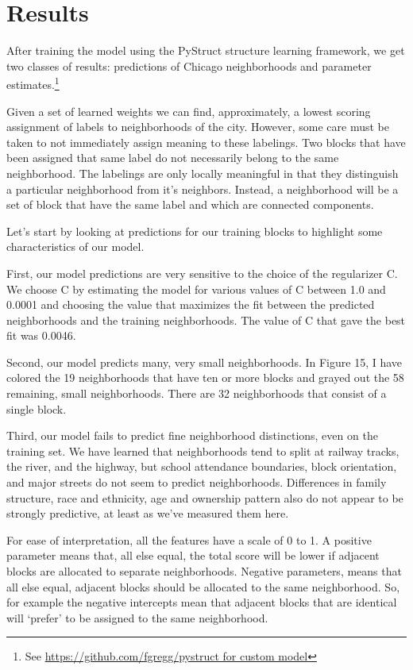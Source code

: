 \documentclass[12pt,letter]{article}\usepackage[]{graphicx}\usepackage[]{color}
\begin{document}
\section*{Results}
After training the model using the PyStruct structure learning
framework,\cite{mueller_pystruct:_????} we get two classes of results:
predictions of Chicago neighborhoods and parameter estimates.\footnote{See \url{https://github.com/fgregg/pystruct for custom model}}

Given a set of learned weights we can find, approximately, a lowest
scoring assignment of labels to neighborhoods of the city. However,
some care must be taken to not immediately assign meaning to these
labelings. Two blocks that have been assigned that same label do not
necessarily belong to the same neighborhood. The labelings are only
locally meaningful in that they distinguish a particular neighborhood
from it’s neighbors. Instead, a neighborhood will be a set of block
that have the same label and which are connected components.  

Let’s start by looking at predictions for our training blocks to
highlight some characteristics of our model.


First, our model predictions are very sensitive to the choice of the regularizer
C. We choose C by estimating the model for various values of C between
1.0 and 0.0001 and choosing the value that maximizes the fit between the
predicted neighborhoods and the training neighborhoods. The value of C
that gave the best fit was 0.0046.

Second, our model predicts many, very small neighborhoods. In Figure 15,
I have colored the 19 neighborhoods that have ten or more blocks and grayed
out the 58 remaining, small neighborhoods. There are 32 neighborhoods that
consist of a single block.

Third, our model fails to predict fine neighborhood distinctions, even
on the training set. We have learned that neighborhoods tend to split at
railway tracks, the river, and the highway, but school attendance boundaries,
block orientation, and major streets do not seem to predict neighborhoods.
Differences in family structure, race and ethnicity, age and ownership pattern
also do not appear to be strongly predictive, at least as we’ve measured them
here.

For ease of interpretation, all the features have a scale of 0 to 1. A
positive parameter means that, all else equal, the total score will be
lower if adjacent blocks are allocated to separate
neighborhoods. Negative parameters, means that all else equal,
adjacent blocks should be allocated to the same neighborhood. So, for
example the negative intercepts mean that adjacent blocks that are
identical will ‘prefer’ to be assigned to the same neighborhood.
\end{document}
